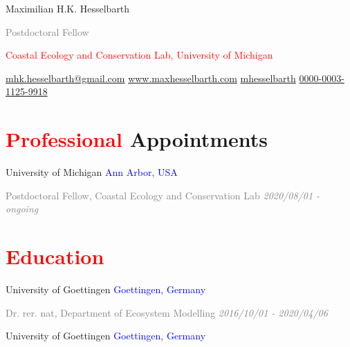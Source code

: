 \documentclass[hidelinks]{report}
\begin{document}

\begin{center}

{\huge Maximilian H.K. Hesselbarth}

\textcolor{grey}{\small{Postdoctoral Fellow}}

\textcolor{red}{Coastal Ecology and Conservation Lab, University of Michigan}

\small{
	\href{mailto:mhk.hesselbarth@gmail.com}{\faEnvelope \hspace{0.1em} mhk.hesselbarth@gmail.com} \hspace{1em}
	\href{https://www.maxhesselbarth.com}{\faHome \hspace{0.1em} www.maxhesselbarth.com} \hspace{1em}
	\href{https://github.com/mhesselbarth}{\faGithub \hspace{0.1em} mhesselbarth} \hspace{1em}
	\href{https://orcid.org/0000-0003-1125-9918}{\orcidlink{} 0000-0003-1125-9918}
}

\end{center}

\vspace{1em}
 

\section*{\textcolor{red}{Professional} Appointments \sout{\hfill}}

University of Michigan
\hfill
\textcolor{blue}{Ann Arbor, USA}

\textcolor{grey}{\footnotesize{Postdoctoral Fellow, Coastal Ecology and Conservation Lab}}
\hfill
\textcolor{grey}{\textit{2020/08/01 - ongoing}}


\section*{\textcolor{red}{Education} \sout{\hfill}}

University of Goettingen
\hfill
\textcolor{blue}{Goettingen, Germany}

\textcolor{grey}{\footnotesize{Dr. rer. nat, Department of Ecosystem Modelling}}
\hfill
\textcolor{grey}{\textit{2016/10/01 - 2020/04/06}}

University of Goettingen
\hfill
\textcolor{blue}{Goettingen, Germany}
\end{document}
